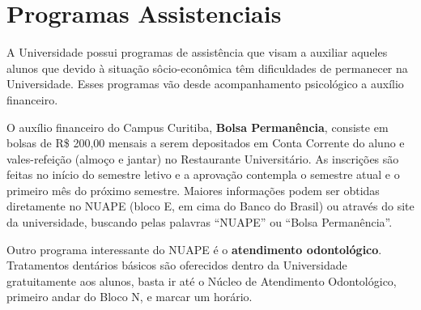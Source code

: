 \documentclass[a4paper,12pt,openany]{article}
\begin{document}




\newpage
\section{Programas Assistenciais} \label{Sec:assist}

A Universidade possui programas de assistência que visam a auxiliar aqueles alunos que devido à situação sôcio-econômica têm dificuldades de permanecer na Universidade.
Esses programas vão desde acompanhamento psicológico a auxílio financeiro.

O auxílio financeiro do Campus Curitiba, \textbf{Bolsa Permanência}, consiste em bolsas de R\$ 200,00 mensais a serem depositados em Conta Corrente do aluno e vales-refeição (almoço e jantar) no Restaurante Universitário. As inscrições são feitas no início do semestre letivo e a aprovação contempla o semestre atual e o primeiro mês do próximo semestre. Maiores informações podem ser obtidas diretamente no NUAPE (bloco E, em cima do Banco do Brasil) ou através do site da universidade, buscando pelas palavras “NUAPE” ou “Bolsa Permanência”.

Outro programa interessante do NUAPE é o \textbf{atendimento odontológico}. Tratamentos dentários básicos são oferecidos dentro da Universidade gratuitamente aos alunos, basta ir até o Núcleo de Atendimento Odontológico, primeiro andar do Bloco N, e marcar um horário.



\end{document}
